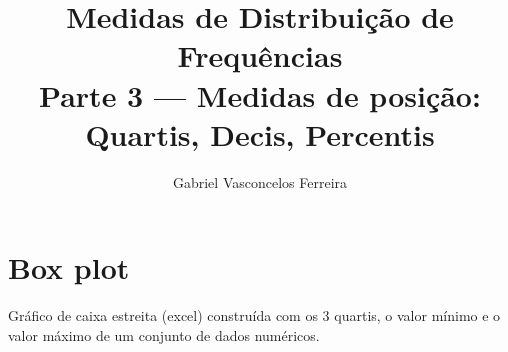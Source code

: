 \documentclass{jhwhw}
\begin{document}
\author{Gabriel Vasconcelos Ferreira}
\title{%
	\large Medidas de Distribuição de Frequências \\
	Parte 3 --- Medidas de posição: Quartis, Decis, Percentis\\
}
\maketitle
\chapter{Box plot}
Gráfico de caixa estreita (excel) construída com os 3 quartis, o valor mínimo e o valor máximo de um conjunto de dados numéricos.
\end{document}
